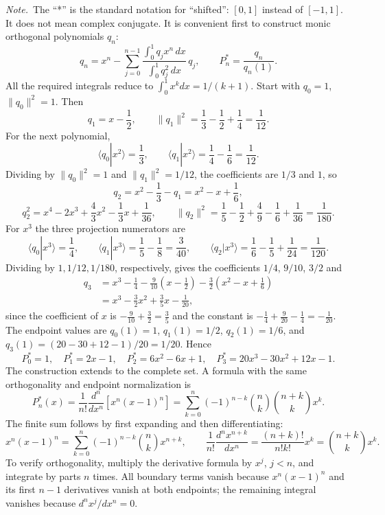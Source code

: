 \emph{Note.}~The ``*'' is the standard notation for ``shifted'': $[0,1]$
instead of $[-1,1]$. It does not mean complex conjugate.
\solution
{}
It is convenient first to construct monic orthogonal polynomials $q_n$:
\[
q_n=x^n-\sum_{j=0}^{n-1}
 \frac{\int_0^1q_jx^n\,dx}{\int_0^1q_j^2\,dx}\,q_j,
\qquad P_n^*=\frac{q_n}{q_n(1)}.
\]
All the required integrals reduce to $\int_0^1x^kdx=1/(k+1)$.
Start with $q_0=1$, $\|q_0\|^2=1$. Then
\[
q_1=x-\frac12,\qquad
\|q_1\|^2=\frac13-\frac12+\frac14=\frac1{12}.
\]
For the next polynomial,
\[
\langle q_0|x^2\rangle=\frac13,\qquad
\langle q_1|x^2\rangle=\frac14-\frac16=\frac1{12}.
\]
Dividing by $\|q_0\|^2=1$ and $\|q_1\|^2=1/12$, the coefficients are $1/3$
and $1$, so
\[
q_2=x^2-\frac13-q_1=x^2-x+\frac16,
\]
\[
q_2^2=x^4-2x^3+\frac43x^2-\frac13x+\frac1{36},\qquad
\|q_2\|^2
=\frac15-\frac12+\frac49-\frac16+\frac1{36}=\frac1{180}.
\]
For $x^3$ the three projection numerators are
\[
\langle q_0|x^3\rangle=\frac14,\qquad
\langle q_1|x^3\rangle=\frac15-\frac18=\frac3{40},\qquad
\langle q_2|x^3\rangle=\frac16-\frac15+\frac1{24}=\frac1{120}.
\]
Dividing by $1,1/12,1/180$, respectively, gives the coefficients
$1/4$, $9/10$, $3/2$ and
\begin{align*}
q_3&=x^3-\frac14-\frac9{10}\left(x-\frac12\right)
 -\frac32\left(x^2-x+\frac16\right)\\
&=x^3-\frac32x^2+\frac35x-\frac1{20},
\end{align*}
since the coefficient of $x$ is $-\frac9{10}+\frac32=\frac35$ and the
constant is $-\frac14+\frac9{20}-\frac14=-\frac1{20}$.
The endpoint values are $q_0(1)=1$, $q_1(1)=1/2$,
$q_2(1)=1/6$, and $q_3(1)=(20-30+12-1)/20=1/20$. Hence
\[
\boxed{P_0^*=1,\quad P_1^*=2x-1,\quad
P_2^*=6x^2-6x+1,\quad P_3^*=20x^3-30x^2+12x-1}.
\]
The construction extends to the complete set. A formula with the same
orthogonality and endpoint normalization is
\[
\boxed{P_n^*(x)=\frac1{n!}\frac{d^n}{dx^n}[x^n(x-1)^n]
=\sum_{k=0}^n(-1)^{n-k}\binom nk\binom{n+k}k x^k}.
\]
The finite sum follows by first expanding and then differentiating:
\[
x^n(x-1)^n=\sum_{k=0}^n(-1)^{n-k}\binom nk x^{n+k},\qquad
\frac1{n!}\frac{d^n x^{n+k}}{dx^n}
=\frac{(n+k)!}{n!k!}x^k=\binom{n+k}k x^k.
\]
To verify orthogonality, multiply the derivative formula by $x^j$, $j<n$, and
integrate by parts $n$ times. All boundary terms vanish because
$x^n(x-1)^n$ and its first $n-1$ derivatives vanish at both endpoints;
the remaining integral vanishes because $d^nx^j/dx^n=0$.
